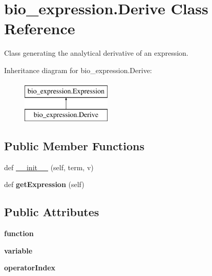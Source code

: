 \hypertarget{classbio__expression_1_1_derive}{}\section{bio\+\_\+expression.\+Derive Class Reference}
\label{classbio__expression_1_1_derive}


Class generating the analytical derivative of an expression.  


Inheritance diagram for bio\+\_\+expression.\+Derive\+:\begin{figure}[H]
\begin{center}
\leavevmode
\includegraphics[height=2.000000cm]{classbio__expression_1_1_derive}
\end{center}
\end{figure}
\subsection*{Public Member Functions}
\begin{DoxyCompactItemize}
\item 
def \hyperlink{classbio__expression_1_1_derive_a4bf3a91d11c13e4ef1016be2671ef2ed}{\+\_\+\+\_\+init\+\_\+\+\_\+} (self, term, v)
\item 
def {\bfseries get\+Expression} (self)\hypertarget{classbio__expression_1_1_derive_a2c4192fb0d697c4484eaaf5478e52a23}{}\label{classbio__expression_1_1_derive_a2c4192fb0d697c4484eaaf5478e52a23}

\end{DoxyCompactItemize}
\subsection*{Public Attributes}
\begin{DoxyCompactItemize}
\item 
{\bfseries function}\hypertarget{classbio__expression_1_1_derive_a1a2eee35fb9f6d59bcd3566d3ed19c83}{}\label{classbio__expression_1_1_derive_a1a2eee35fb9f6d59bcd3566d3ed19c83}

\item 
{\bfseries variable}\hypertarget{classbio__expression_1_1_derive_a341cac7e9fa0b5aec5de04f9a78b6f6b}{}\label{classbio__expression_1_1_derive_a341cac7e9fa0b5aec5de04f9a78b6f6b}

\item 
{\bfseries operator\+Index}\hypertarget{classbio__expression_1_1_derive_acc082adfb3029c3237009c0f47502918}{}\label{classbio__expression_1_1_derive_acc082adfb3029c3237009c0f47502918}

\end{DoxyCompactItemize}


